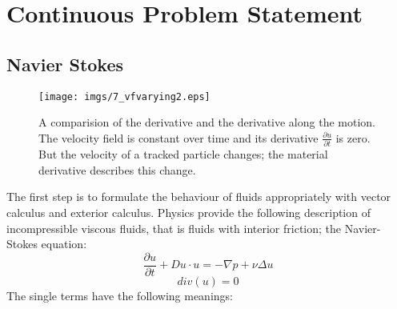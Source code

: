 
\section{Continuous Problem Statement}


\subsection{Navier Stokes}

\begin{figure}%
\begin{center}
\texttt{[image: imgs/7\_vfvarying2.eps]}%
\end{center}
\caption{A comparision of the derivative and the derivative along the motion. The velocity field is constant over time and its derivative $\frac{\partial u}{\partial t}$ is zero. But the velocity of a tracked particle changes; the material derivative describes this change.}%
\label{fig:fsmaterialderivative}%
\end{figure}

The first step is to formulate the behaviour of fluids appropriately with vector calculus and exterior calculus. 
Physics provide the following description of incompressible viscous fluids, that is fluids with interior friction; the Navier-Stokes equation:
\[\frac{\partial u}{\partial t} + Du \cdot u = -\nabla p + \nu \Delta u\]
\begin{equation}div(u) = 0\label{eq:NS}\end{equation} 
The single terms have the following meanings:

